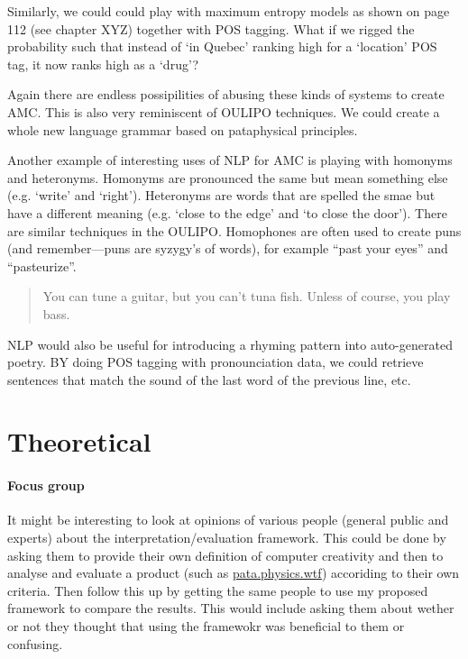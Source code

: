 Similarly, we could could play with maximum entropy models as shown on page 112 (see chapter XYZ) together with \ac{POS} tagging. What if we rigged the probability such that instead of `in Quebec' ranking high for a `location' \ac{POS} tag, it now ranks high as a `drug'?


Again there are endless possipilities of abusing these kinds of systems to create \ac{AMC}. This is also very reminiscent of \ac{OULIPO} techniques. We could create a whole new language grammar based on pataphysical principles.

Another example of interesting uses of \ac{NLP} for \ac{AMC} is playing with homonyms and heteronyms. Homonyms are pronounced the same but mean something else (e.g. `write' and `right'). Heteronyms are words that are spelled the smae but have a different meaning (e.g. `close to the edge' and `to close the door'). There are similar techniques in the \ac{OULIPO}. Homophones are often used to create puns (and remember---puns are syzygy's of words), for example ``past your eyes'' and ``pasteurize''. 

\begin{quotation}
   You can tune a guitar, but you can't tuna fish. Unless of course, you play bass. 
\end{quotation}

\ac{NLP} would also be useful for introducing a rhyming pattern into auto-generated poetry. BY doing \ac{POS} tagging with pronounciation data, we could retrieve sentences that match the sound of the last word of the previous line, etc.





\section{Theoretical}

\paragraph{Focus group}
It might be interesting to look at opinions of various people (general public and experts) about the interpretation/evaluation framework. This could be done by asking them to provide their own definition of computer creativity and then to analyse and evaluate a product (such as \url{pata.physics.wtf}) accoriding to their own criteria. Then follow this up by getting the same people to use my proposed framework to compare the results. This would include asking them about wether or not they thought that using the framewokr was beneficial to them or confusing.

